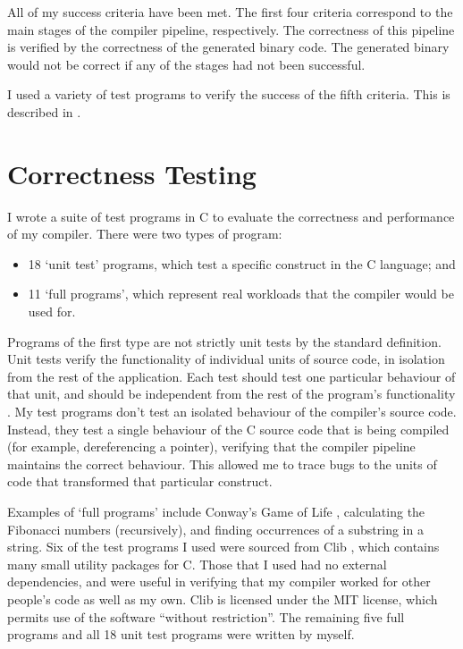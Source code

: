 \documentclass[00-main.tex]{subfiles}
\begin{document}
All of my success criteria have been met.
The first four criteria correspond to the main stages of the compiler pipeline, respectively.
The correctness of this pipeline is verified by the correctness of the generated binary code.
The generated binary would not be correct if any of the stages had not been successful.

I used a variety of test programs to verify the success of the fifth criteria. This is described in .


\section{Correctness Testing}\label{sec:eval:correctness testing}

I wrote a suite of test programs in C to evaluate the correctness and performance of my compiler.
There were two types of program:
\begin{itemize}
\item 18 `unit test' programs, which test a specific construct in the C language; and
\item 11 `full programs', which represent real workloads that the compiler would be used for.
\end{itemize}

Programs of the first type are not strictly unit tests by the standard definition.
Unit tests verify the functionality of individual units of source code, in isolation from the rest of the application.
Each test should test one particular behaviour of that unit, and should be independent from the rest of the program's functionality .
My test programs don't test an isolated behaviour of the compiler's source code.
Instead, they test a single behaviour of the C source code that is being compiled (for example, dereferencing a pointer), verifying that the compiler pipeline maintains the correct behaviour.
This allowed me to trace bugs to the units of code that transformed that particular construct.

Examples of `full programs' include Conway's Game of Life , calculating the Fibonacci numbers (recursively), and finding occurrences of a substring in a string.
Six of the test programs I used were sourced from Clib , which contains many small utility packages for C. Those that I used had no external dependencies, and were useful in verifying that my compiler worked for other people's code as well as my own. Clib is licensed under the MIT license, which permits use of the software ``without restriction''.
The remaining five full programs and all 18 unit test programs were written by myself.
\end{document}
